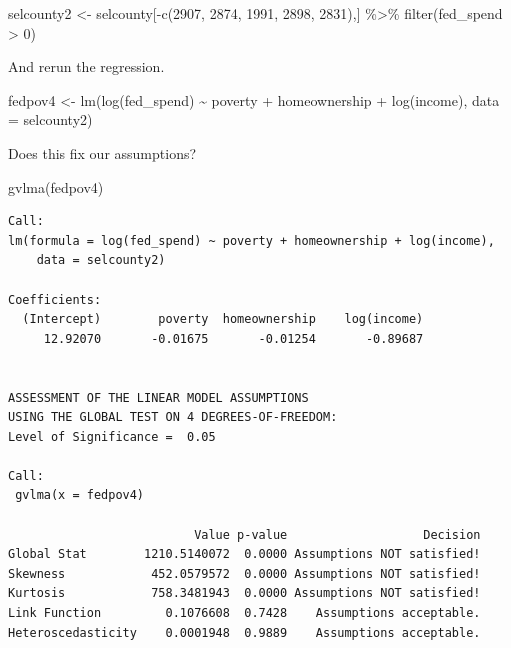 \documentclass[
]{book}
\makeatletter
\newenvironment{Shaded}{\begin{snugshade}}{\end{snugshade}}
\newcommand{\AttributeTok}[1]{\textcolor[rgb]{0.61,0.61,0.61}{#1}}
\newcommand{\DecValTok}[1]{\textcolor[rgb]{0.06,0.06,0.06}{#1}}
\newcommand{\FunctionTok}[1]{\textcolor[rgb]{0,0,0}{#1}}
\newcommand{\NormalTok}[1]{#1}
\newcommand{\OtherTok}[1]{\textcolor[rgb]{0.37,0.37,0.37}{#1}}
\newcommand{\SpecialCharTok}[1]{\textcolor[rgb]{0,0,0}{#1}}
\newenvironment{kframe}{%
\medskip{}
\setlength{\fboxsep}{.8em}
 \def\at@end@of@kframe{}%
 \ifinner\ifhmode%
  \def\at@end@of@kframe{\end{minipage}}%
  \begin{minipage}{\columnwidth}%
 \fi\fi%
 \def\FrameCommand##1{\hskip\@totalleftmargin \hskip-\fboxsep
 \colorbox{shadecolor}{##1}\hskip-\fboxsep
     \hskip-\linewidth \hskip-\@totalleftmargin \hskip\columnwidth}%
 \MakeFramed {\advance\hsize-\width
   \@totalleftmargin\z@ \linewidth\hsize
   \@setminipage}}%
 {\par\unskip\endMakeFramed%
 \at@end@of@kframe}
\renewenvironment{Shaded}{\begin{kframe}}{\end{kframe}}
\makeatother
\begin{document}
\begin{Shaded}
\begin{Highlighting}[]
\NormalTok{selcounty2 }\OtherTok{\textless{}{-}}\NormalTok{ selcounty[}\SpecialCharTok{{-}}\FunctionTok{c}\NormalTok{(}\DecValTok{2907}\NormalTok{, }\DecValTok{2874}\NormalTok{, }\DecValTok{1991}\NormalTok{, }\DecValTok{2898}\NormalTok{, }\DecValTok{2831}\NormalTok{),] }\SpecialCharTok{\%\textgreater{}\%} 
  \FunctionTok{filter}\NormalTok{(fed\_spend }\SpecialCharTok{\textgreater{}} \DecValTok{0}\NormalTok{)}
\end{Highlighting}
\end{Shaded}

And rerun the regression.

\begin{Shaded}
\begin{Highlighting}[]
\NormalTok{fedpov4 }\OtherTok{\textless{}{-}} \FunctionTok{lm}\NormalTok{(}\FunctionTok{log}\NormalTok{(fed\_spend) }\SpecialCharTok{\textasciitilde{}}\NormalTok{ poverty }\SpecialCharTok{+}\NormalTok{ homeownership }\SpecialCharTok{+} \FunctionTok{log}\NormalTok{(income), }
              \AttributeTok{data =}\NormalTok{ selcounty2)}
\end{Highlighting}
\end{Shaded}

Does this fix our assumptions?

\begin{Shaded}
\begin{Highlighting}[]
\FunctionTok{gvlma}\NormalTok{(fedpov4)}
\end{Highlighting}
\end{Shaded}

\begin{verbatim}
Call:
lm(formula = log(fed_spend) ~ poverty + homeownership + log(income), 
    data = selcounty2)

Coefficients:
  (Intercept)        poverty  homeownership    log(income)  
     12.92070       -0.01675       -0.01254       -0.89687  


ASSESSMENT OF THE LINEAR MODEL ASSUMPTIONS
USING THE GLOBAL TEST ON 4 DEGREES-OF-FREEDOM:
Level of Significance =  0.05 

Call:
 gvlma(x = fedpov4) 

                          Value p-value                   Decision
Global Stat        1210.5140072  0.0000 Assumptions NOT satisfied!
Skewness            452.0579572  0.0000 Assumptions NOT satisfied!
Kurtosis            758.3481943  0.0000 Assumptions NOT satisfied!
Link Function         0.1076608  0.7428    Assumptions acceptable.
Heteroscedasticity    0.0001948  0.9889    Assumptions acceptable.
\end{verbatim}
\end{document}

